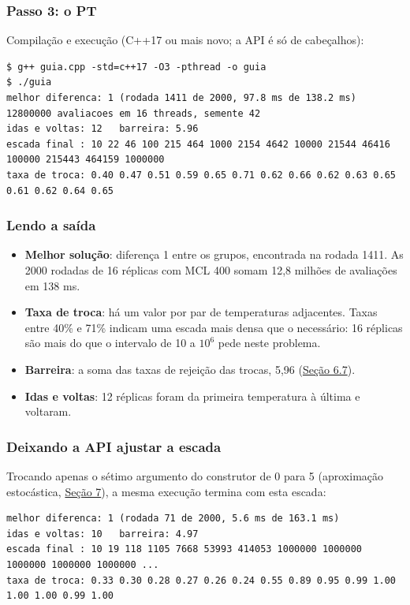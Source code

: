 \documentclass[10pt,a4paper]{article}
\begin{document}
\subsubsection*{Passo 3: o PT}



Compilação e execução (C++17 ou mais novo; a API é só de cabeçalhos):

\begin{lstlisting}[style=saida]
$ g++ guia.cpp -std=c++17 -O3 -pthread -o guia
$ ./guia
melhor diferenca: 1 (rodada 1411 de 2000, 97.8 ms de 138.2 ms)
12800000 avaliacoes em 16 threads, semente 42
idas e voltas: 12   barreira: 5.96
escada final : 10 22 46 100 215 464 1000 2154 4642 10000 21544 46416 100000 215443 464159 1000000
taxa de troca: 0.40 0.47 0.51 0.59 0.65 0.71 0.62 0.66 0.62 0.63 0.65 0.61 0.62 0.64 0.65
\end{lstlisting}

\subsubsection*{Lendo a saída}

\begin{itemize}
\item \textbf{Melhor solução}: diferença 1 entre os grupos, encontrada na rodada 1411. As 2000 rodadas de 16 réplicas com MCL 400 somam 12,8 milhões de avaliações em 138 ms.
\item \textbf{Taxa de troca}: há um valor por par de temperaturas adjacentes. Taxas entre 40\% e 71\% indicam uma escada mais densa que o necessário: 16 réplicas são mais do que o intervalo de 10 a $10^{6}$ pede neste problema.
\item \textbf{Barreira}: a soma das taxas de rejeição das trocas, 5,96 (\hyperref[s6]{Seção 6.7}).
\item \textbf{Idas e voltas}: 12 réplicas foram da primeira temperatura à última e voltaram. \end{itemize}

\subsubsection*{Deixando a API ajustar a escada}

Trocando apenas o sétimo argumento do construtor de 0 para 5 (aproximação estocástica, \hyperref[s7]{Seção 7}), a mesma execução termina com esta escada:

\begin{lstlisting}[style=saida]
melhor diferenca: 1 (rodada 71 de 2000, 5.6 ms de 163.1 ms)
idas e voltas: 10   barreira: 4.97
escada final : 10 19 118 1105 7668 53993 414053 1000000 1000000 1000000 1000000 1000000 ...
taxa de troca: 0.33 0.30 0.28 0.27 0.26 0.24 0.55 0.89 0.95 0.99 1.00 1.00 1.00 0.99 1.00
\end{lstlisting}
\end{document}
